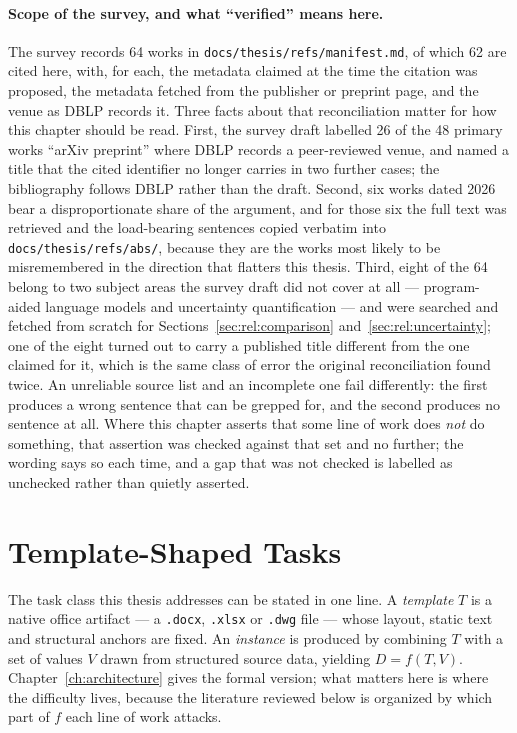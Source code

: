 \paragraph{Scope of the survey, and what ``verified'' means here.}
The survey records 64 works in \texttt{docs/thesis/refs/manifest.md}, of which 62 are cited
here, with, for each,
the metadata claimed at the time the citation was proposed, the metadata fetched from the
publisher or preprint page, and the venue as DBLP records it. Three facts about that
reconciliation matter for how
this chapter should be read. First, the survey draft labelled 26 of the 48 primary works
``arXiv preprint'' where DBLP records a peer-reviewed venue, and named a title that the cited
identifier no longer carries in two further cases; the bibliography follows DBLP rather than
the draft. Second, six works dated 2026 bear a disproportionate share of the argument, and
for those six the full text was retrieved and the load-bearing sentences copied verbatim into
\texttt{docs/thesis/refs/abs/}, because they are the works most likely to be
misremembered in the direction that flatters this thesis. Third, eight of the 64 belong to two
subject areas the survey draft did not cover at all --- program-aided language models and
uncertainty quantification --- and were searched and fetched from scratch for
Sections~\ref{sec:rel:comparison} and~\ref{sec:rel:uncertainty}; one of the eight turned out to
carry a published title different from the one claimed for it, which is the same class of
error the original reconciliation found twice. An unreliable source list and an incomplete one
fail differently: the first produces a wrong sentence that can be grepped for, and the second
produces no sentence at all. Where this chapter asserts that some
line of work does \emph{not} do something, that assertion was checked against that set
and no further; the wording says so each time, and a gap that was not checked is labelled as
unchecked rather than quietly asserted.

\section{Template-Shaped Tasks}
\label{sec:rel:tasks}

The task class this thesis addresses can be stated in one line. A \emph{template} $T$ is a
native office artifact --- a \texttt{.docx}, \texttt{.xlsx} or \texttt{.dwg} file --- whose
layout, static text and structural anchors are fixed. An \emph{instance} is produced by
combining $T$ with a set of values $V$ drawn from structured source data, yielding
$D = f(T, V)$. Chapter~\ref{ch:architecture} gives the formal version; what matters here is
where the difficulty lives, because the literature reviewed below is organized by which part
of $f$ each line of work attacks.

